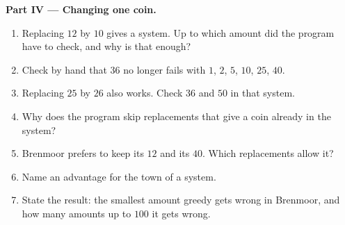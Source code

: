 \begin{problem}
\medskip\noindent\textbf{Part IV --- Changing one coin.}
\begin{enumerate}[resume]
  \item Replacing $12$ by $10$ gives a  system. Up to which amount did the program have to check, and why is
    that enough?
  \item Check by hand that $36$ no longer fails with $1$, $2$, $5$, $10$, $25$, $40$.
  \item Replacing $25$ by $26$ also works. Check $36$ and $50$ in that system.
  \item Why does the program skip replacements that give a coin already in the system?
  \item Brenmoor prefers to keep its $12$ and its $40$. Which replacements allow it?
  \item Name an advantage for the town of a  system.
  \item State the result: the smallest amount greedy gets wrong in Brenmoor, and how many amounts up to $100$ it gets
    wrong.
\end{enumerate}
\end{problem}
